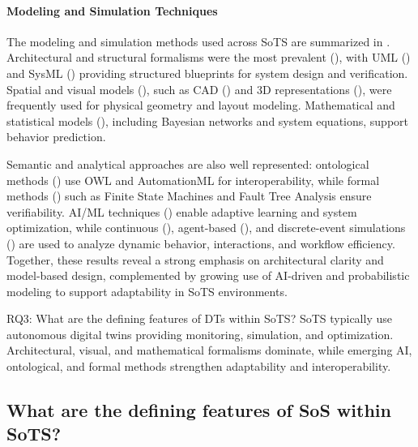 
\paragraph{Modeling and Simulation Techniques}\label{para:lt-rq2-modeling-sim-techniques}
The modeling and simulation methods used across SoTS are summarized in .
Architectural and structural formalisms were the most prevalent (), with UML () and SysML () providing structured blueprints for system design and verification. Spatial and visual models (), such as CAD () and 3D representations (), were frequently used for physical geometry and layout modeling. Mathematical and statistical models (), including Bayesian networks and system equations, support behavior prediction. 

Semantic and analytical approaches are also well represented: ontological methods () use OWL and AutomationML for interoperability, while formal methods () such as Finite State Machines and Fault Tree Analysis ensure verifiability. AI/ML techniques () enable adaptive learning and system optimization, while continuous (), agent-based (), and discrete-event simulations () are used to analyze dynamic behavior, interactions, and workflow efficiency. Together, these results reveal a strong emphasis on architectural clarity and model-based design, complemented by growing use of AI-driven and probabilistic modeling to support adaptability in SoTS environments.


\vspace{1em}
\begin{conclusionframe}{RQ3: What are the defining features of DTs within SoTS?}
SoTS typically use autonomous digital twins providing monitoring, simulation, and optimization. Architectural, visual, and mathematical formalisms dominate, while emerging AI, ontological, and formal methods strengthen adaptability and interoperability.
\end{conclusionframe}



\subsection{What are the defining features of SoS within SoTS?}\label{subsec:literature-review-results-rq4}

